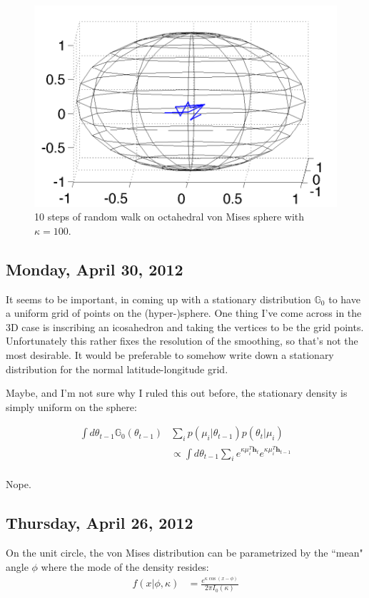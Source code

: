 \documentclass[11pt]{article}
\newcommand{\mb}{\mathbb}
\begin{document}
\begin{figure}[h!]
\centering
\includegraphics[scale=0.35]{../fig/vm-walk__k_100__t_10.pdf}
\caption{10 steps of random walk on octahedral von Mises sphere with $\kappa=100$.}
\label{fig:vm-walk__k_100__t_10}
\end{figure}

\subsection*{Monday, April 30, 2012}
It seems to be important, in coming up with a stationary distribution $\mb{G}_0$ to have a uniform grid of points on the (hyper-)sphere. One thing I've come across in the 3D case is inscribing an icosahedron and taking the vertices to be the grid points. Unfortunately this rather fixes the resolution of the smoothing, so that's not the most desirable. It would be preferable to somehow write down a stationary distribution for the normal latitude-longitude grid.

Maybe, and I'm not sure why I ruled this out before, the stationary density is simply uniform on the sphere:

\begin{align*}
\int d\theta_{t-1} \mb{G}_0(\theta_{t-1}) &\sum_i p(\mu_i|\theta_{t-1})p(\theta_t|\mu_i) \\
&\propto \int d\theta_{t-1} \sum_i e^{\kappa \mu_i^T\mathbf{h}_t} e^{\kappa\mu_i^T\mathbf{h}_{t-1}} \\
\end{align*}

\noindent Nope.

\subsection*{Thursday, April 26, 2012}
On the unit circle, the von Mises distribution can be parametrized by the ``mean" angle $\phi$ where the mode of the density resides:
%
\begin{align*}
f(x|\phi,\kappa) &= \frac{e^{\kappa\cos(x-\phi)}}{2\pi I_0(\kappa)}
\end{align*}
\end{document}
